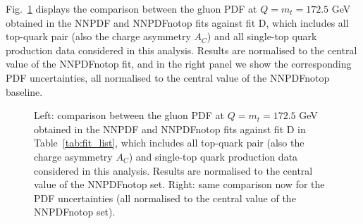 \documentclass[withindex,glossary]{cam-thesis}
\begin{document}
Fig.~\ref{fig:fitD_gluon}
displays the comparison between the gluon PDF at $Q=m_t=172.5$ GeV obtained
in the NNPDF and NNPDFnotop fits against fit D, which includes all top-quark
pair (also the charge asymmetry $A_C$) and all single-top quark production
data considered in this analysis.
%
Results are normalised to the central value of the NNPDFnotop fit,
and in the right panel we show the corresponding PDF uncertainties, all 
normalised to the central value of the NNPDFnotop baseline. 
%
\begin{figure}[t]
\centering
        \caption{Left: comparison between the gluon PDF at $Q=m_t=172.5$ GeV
          obtained in the NNPDF and NNPDFnotop fits
          against fit D in Table~\ref{tab:fit_list}, which includes all
          top-quark
          pair (also the charge asymmetry $A_C$)
          and single-top quark production data considered in this analysis.
          Results are normalised to the central value of the NNPDFnotop set.
          Right: same comparison now for the PDF uncertainties (all
          normalised to the central value of the NNPDFnotop set).
}
\label{fig:fitD_gluon}
\end{figure}
\end{document}
